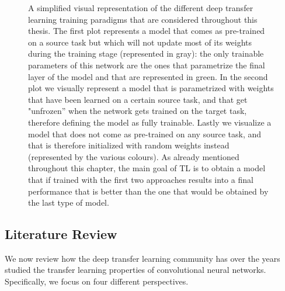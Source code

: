 \begin{figure}[!htb]
\endminipage
\caption{A simplified visual representation of the different deep transfer learning training paradigms that are considered throughout this thesis. The first plot represents a model that comes as pre-trained on a source task but which will not update most of its weights during the training stage (represented in gray): the only trainable parameters of this network are the ones that parametrize the final layer of the model and that are represented in green. In the second plot we visually represent a model that is parametrized with weights that have been learned on a certain source task, and that get "unfrozen'' when the network gets trained on the target task, therefore defining the model as fully trainable. Lastly we visualize a model that does not come as pre-trained on any source task, and that is therefore initialized with random weights instead (represented by the various colours). As already mentioned throughout this chapter, the main goal of TL is to obtain a model that if trained with the first two approaches results into a final performance that is better than the one that would be obtained by the last type of model.}
\label{fig:network_training_approaches}
\end{figure}


\subsection{Literature Review}
\label{sec:literature_review_ch03}

We now review how the deep transfer learning community has over the years studied the transfer learning properties of convolutional neural networks. Specifically, we focus on four different perspectives.

